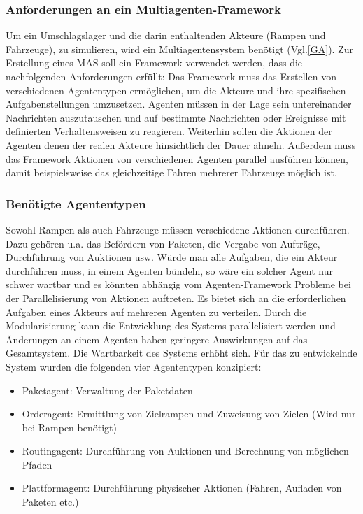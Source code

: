 \subsubsection{Anforderungen an ein Multiagenten-Framework}
Um ein Umschlagslager und die darin enthaltenden Akteure (Rampen und Fahrzeuge), zu simulieren, wird ein Multiagentensystem benötigt (Vgl.\ref{GA}). Zur Erstellung eines MAS soll ein Framework verwendet werden, dass die nachfolgenden Anforderungen erfüllt: Das Framework muss das Erstellen von verschiedenen Agententypen ermöglichen, um die Akteure und ihre spezifischen Aufgabenstellungen umzusetzen. Agenten müssen in der Lage sein untereinander Nachrichten auszutauschen und auf bestimmte Nachrichten oder Ereignisse mit definierten Verhaltensweisen zu reagieren. Weiterhin sollen die Aktionen der Agenten denen der realen Akteure hinsichtlich der Dauer ähneln. Außerdem muss das Framework Aktionen von verschiedenen Agenten parallel ausführen können, damit beispielsweise das gleichzeitige Fahren mehrerer Fahrzeuge möglich ist.
\subsubsection{Benötigte Agententypen}
Sowohl Rampen als auch Fahrzeuge müssen verschiedene Aktionen durchführen. Dazu gehören u.a. das Befördern von Paketen, die Vergabe von Aufträge, Durchführung von Auktionen usw. Würde man alle Aufgaben, die ein Akteur durchführen muss, in einem Agenten bündeln, so wäre ein solcher Agent nur schwer wartbar und es könnten abhängig vom Agenten-Framework Probleme bei der Parallelisierung von Aktionen auftreten. Es bietet sich an die erforderlichen Aufgaben eines Akteurs auf mehreren Agenten zu verteilen. Durch die Modularisierung kann die Entwicklung des Systems parallelisiert werden und Änderungen an einem Agenten haben geringere Auswirkungen auf das Gesamtsystem. Die Wartbarkeit des Systems erhöht sich. Für das zu entwickelnde System wurden die folgenden vier Agententypen konzipiert:  
\begin{itemize}
\item Paketagent: Verwaltung der Paketdaten
\item Orderagent: Ermittlung von Zielrampen und Zuweisung von Zielen (Wird nur bei Rampen benötigt)
\item Routingagent: Durchführung von Auktionen und Berechnung von möglichen Pfaden
\item Plattformagent: Durchführung physischer Aktionen (Fahren, Aufladen von Paketen etc.)
\end{itemize}

